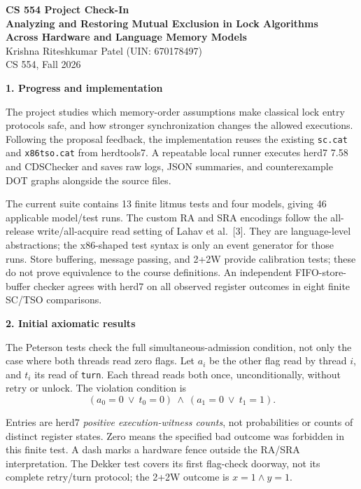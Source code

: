 \documentclass[11pt]{article}
\newcommand{\sect}[1]{\medskip\noindent\textbf{#1}\par\smallskip}
\newcommand{\code}[1]{\texttt{#1}}
\begin{document}
\begin{center}
{\Large\bfseries CS 554 Project Check-In}\\[4pt]
{\bfseries Analyzing and Restoring Mutual Exclusion in Lock Algorithms\\
Across Hardware and Language Memory Models}\\[5pt]
Krishna Riteshkumar Patel (UIN: 670178497)\\
CS 554, Fall 2026
\end{center}
\vspace{-5pt}

\sect{1. Progress and implementation}
The project studies which memory-order assumptions make classical lock entry
protocols safe, and how stronger synchronization changes the allowed executions.
Following the proposal feedback, the implementation reuses the existing
\code{sc.cat} and \code{x86tso.cat} from herdtools7. A repeatable local runner
executes herd7 7.58 and CDSChecker and saves raw logs, JSON summaries, and
counterexample DOT graphs alongside the source files.

The current suite contains 13 finite litmus tests and four models, giving 46
applicable model/test runs. The custom RA and SRA encodings follow the all-release
write/all-acquire read setting of Lahav et al.~[3]. They are language-level
abstractions; the x86-shaped test syntax is only an event generator for those
runs. Store buffering, message passing, and 2+2W provide calibration tests;
these do not prove equivalence to the course definitions.
An independent FIFO-store-buffer checker agrees with herd7 on all observed
register outcomes in eight finite SC/TSO comparisons.

\sect{2. Initial axiomatic results}
The Peterson tests check the full simultaneous-admission condition, not only the
case where both threads read zero flags. Let $a_i$ be the other flag read by
thread $i$, and $t_i$ its read of \code{turn}. Each thread reads both once,
unconditionally, without retry or unlock. The violation condition is
\[
        (a_0=0\ \lor\ t_0=0)\ \land\ (a_1=0\ \lor\ t_1=1).
\]
\vspace{-8pt}
\begin{center}
\small

\end{center}
\vspace{-5pt}
Entries are herd7 \emph{positive execution-witness counts}, not probabilities
or counts of distinct register states. Zero means the specified bad outcome
was forbidden in this finite test. A dash marks a hardware fence outside the
RA/SRA interpretation. The Dekker test covers its first flag-check doorway,
not its complete retry/turn protocol; the 2+2W outcome is $x=1\land y=1$.
\end{document}
